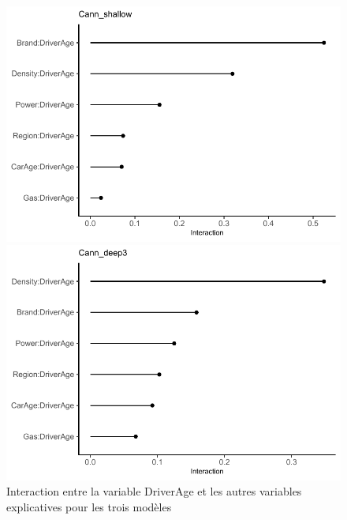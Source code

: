 \begin{figure}
\caption{\label{fig:inter3Driver} Interaction entre la variable DriverAge et les autres variables explicatives pour les trois modèles}
\centering
\begin{minipage}{0.45\linewidth}
\includegraphics[scale=0.6]{Graphiques/interDriverAgeShallow}
\end{minipage}
\hfill
\begin{minipage}{0.45\linewidth}
\includegraphics[scale=0.6]{Graphiques/interDriverAgeCann}
\end{minipage}
\end{figure}

